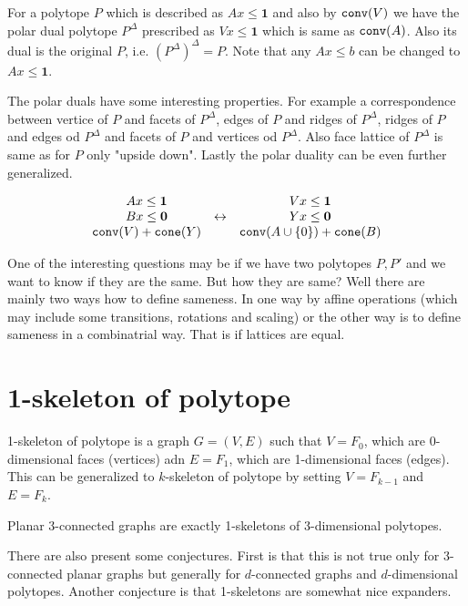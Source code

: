 For a polytope $P$ which is described as $A x \leq \bm{1}$ and also by $\mathtt{conv}(V)$ we have the polar dual polytope $P^{\Delta}$ prescribed as $V x \leq \bm{1}$ which is same as $\mathtt{conv}(A)$. Also its dual is the original $P$, i.e. $(P^\Delta)^\Delta = P$. Note that any $A x \leq b$ can be changed to $A x \leq \bm{1}$.

The polar duals have some interesting properties. For example a correspondence between vertice of $P$ and facets of $P^{\Delta}$, edges of $P$ and ridges of $P^{\Delta}$, ridges of $P$ and edges od $P^{\Delta}$ and facets of $P$ and vertices od $P^{\Delta}$. Also face lattice of $P^{\Delta}$ is same as for $P$ only "upside down". Lastly the polar duality can be even further generalized.

$$
\begin{array}{c c c}
	A x \leq \bm{1} &  & V x \leq \bm{1} \\
	B x \leq \bm{0} & \leftrightarrow & Y x \leq \bm{0} \\
	\mathtt{conv}(V) + \mathtt{cone}(Y) & & \mathtt{conv}(A \cup \{0\}) + \mathtt{cone}(B)
\end{array}
$$

One of the interesting questions may be if we have two polytopes $P,P'$ and we want to know if they are the same. But how they are same? Well there are mainly two ways how to define sameness. In one way by affine operations (which may include some transitions, rotations and scaling) or the other way is to define sameness in a combinatrial way. That is if lattices are equal.

\section{1-skeleton of polytope}

\begin{defn}
	1-skeleton of polytope is a graph $G = (V,E)$ such that $V = F_{0}$, which are 0-dimensional faces (vertices) adn $E = F_{1}$, which are 1-dimensional faces (edges). This can be generalized to $k$-skeleton of polytope by setting $V = F_{k-1}$ and $E = F_{k}$.
\end{defn}

\begin{thm}[Steinitz]
	Planar 3-connected graphs are exactly 1-skeletons of 3-dimensional polytopes.
\end{thm}

There are also present some conjectures. First is that this is not true only for 3-connected planar graphs but generally for $d$-connected graphs and $d$-dimensional polytopes. Another conjecture is that 1-skeletons are somewhat nice expanders.


